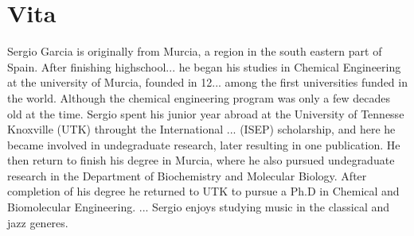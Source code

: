 \chapter*{Vita} \label{ch:vita}
Sergio Garcia is originally from Murcia, a region in the south eastern part of Spain. After finishing highschool... he began his studies in Chemical Engineering at the university of Murcia, founded in 12... among the first universities funded in the world. Although the chemical engineering program was only a few decades old at the time. Sergio spent his junior year abroad at the University of Tennesse Knoxville (UTK) throught the International ... (ISEP) scholarship, and here he became involved in undegraduate research, later resulting in one publication. He then return to finish his degree in Murcia, where he also pursued undegraduate research in the Department of Biochemistry and Molecular Biology. After completion of his degree he returned to UTK to pursue a Ph.D in Chemical and Biomolecular Engineering.
... Sergio enjoys studying music in the classical and jazz generes.
